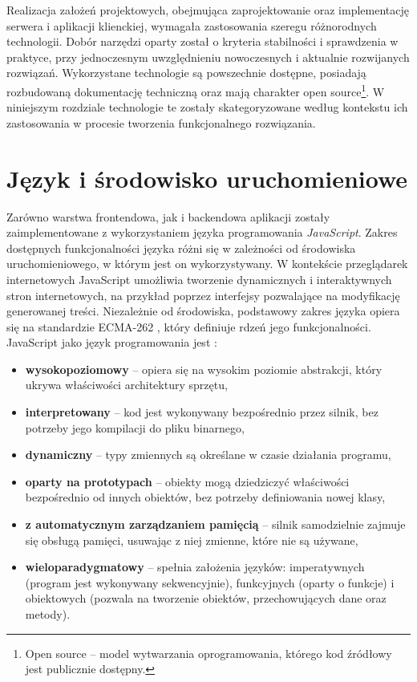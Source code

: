 Realizacja założeń projektowych, obejmująca zaprojektowanie oraz implementację serwera i aplikacji klienckiej, wymagała zastosowania szeregu różnorodnych technologii.
Dobór narzędzi oparty został o kryteria stabilności i sprawdzenia w praktyce, przy jednoczesnym uwzględnieniu nowoczesnych i aktualnie rozwijanych rozwiązań.
Wykorzystane technologie są powszechnie dostępne, posiadają rozbudowaną dokumentację techniczną oraz mają charakter open source\footnote{Open source -- model wytwarzania oprogramowania, którego kod źródłowy jest publicznie dostępny.}.
W niniejszym rozdziale technologie te zostały skategoryzowane według kontekstu ich zastosowania w procesie tworzenia funkcjonalnego rozwiązania.

\section{Język i środowisko uruchomieniowe}

Zarówno warstwa frontendowa, jak i backendowa aplikacji zostały zaimplementowane z wykorzystaniem języka programowania \emph{JavaScript}.
Zakres dostępnych funkcjonalności języka różni się w zależności od środowiska uruchomieniowego, w którym jest on wykorzystywany.
W kontekście przeglądarek internetowych JavaScript umożliwia tworzenie dynamicznych i interaktywnych stron internetowych, na przykład poprzez interfejsy pozwalające na modyfikację generowanej treści.
Niezależnie od środowiska, podstawowy zakres języka opiera się na standardzie ECMA-262 \autocite{ecma262}, który definiuje rdzeń jego funkcjonalności.
JavaScript jako język programowania jest \autocite{mdn_javascript}:
%
\begin{itemize}
    \item \textbf{wysokopoziomowy} -- opiera się na wysokim poziomie abstrakcji, który ukrywa właściwości architektury sprzętu,
    \item \textbf{interpretowany} -- kod jest wykonywany bezpośrednio przez silnik, bez potrzeby jego kompilacji do pliku binarnego,
    \item \textbf{dynamiczny} -- typy zmiennych są określane w czasie działania programu,
    \item \textbf{oparty na prototypach} -- obiekty mogą dziedziczyć właściwości bezpośrednio od innych obiektów, bez potrzeby definiowania nowej klasy,
    \item \textbf{z automatycznym zarządzaniem pamięcią} -- silnik samodzielnie zajmuje się obsługą pamięci, usuwając z niej zmienne, które nie są używane,
    \item \textbf{wieloparadygmatowy} -- spełnia założenia języków: imperatywnych (program jest wykonywany sekwencyjnie), funkcyjnych (oparty o funkcje) i obiektowych (pozwala na tworzenie obiektów, przechowujących dane oraz metody).
\end{itemize}

